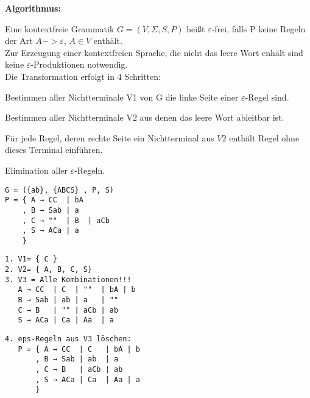 \documentclass[11pt,
			a4paper,
			parskip=full,
			toc=bib,
			toc=idx,
			toc=listof,
			ngerman
			listof=totoc,]{scrartcl}
\newcommand{\ergaenzen}[1]{%
	\tt{%
		\textbf{%
				\textcolor{red}{#1}%
		}%
	}%
	\rm%
}
\newcommand{\concept}[1]{%
	\sf{%
		\textbf{%
				\textcolor{mymauve}{#1}%
		}%
	}%
	\rm%
}
\newenvironment{algo}[1]%
{	\begin{framed}
	\textbf{Algorithmus:} \concept{#1}}%
{\end{framed}}
\newenvironment{expl}%
{\color{red}}
{\color{black}}
\newcommand{\compress}{\vspace{-1em}}
\begin{document}





\newpage
\begin{algo}{Eliminierung aller $ε$-Regeln}

\compress
Eine kontextfreie Grammatik $G=(V,Σ,S,P)$ heißt $ε$-frei,
falls P keine Regeln der Art $A -> ε$, $A \in V$ enthält. \\
Zur Erzeugung einer kontextfreien Sprache, die nicht das leere Wort
enhält sind keine $ε$-Produktionen notwendig.\\
Die Transformation erfolgt in 4 Schritten:

\compress
\begin{compactenum}
\item Bestimmen aller Nichtterminale V1 von G die linke Seite einer $ε$-Regel sind.
\item Bestimmen aller Nichtterminale V2 aus denen das leere Wort ableitbar ist.
\item Für jede Regel, deren rechte Seite ein Nichtterminal aus $V2$ enthält 
      Regel ohne dieses Terminal einführen.
\item Elimination aller $ε$-Regeln.
\end{compactenum}
\end{algo}

\compress
\compress
\begin{expl}
\begin{minipage}[t]{1\linewidth}
  \begin{minipage}[t]{0.3\linewidth}
    \begin{verbatim}
G = ({ab}, {ABCS} , P, S)
P = { A → CC  | bA 
    , B → Sab | a  
    , C → ""  | B  | aCb 
    , S → ACa | a 
    }
    \end{verbatim}
  \end{minipage}
  \begin{minipage}[t]{0.325\linewidth}
    \begin{verbatim}
1. V1= { C }
2. V2= { A, B, C, S} 
3. V3 = Alle Kombinationen!!!
   A → CC  | C  | ""  | bA | b
   B → Sab | ab | a   | ""
   C → B   | "" | aCb | ab
   S → ACa | Ca | Aa  | a 
    \end{verbatim}
  \end{minipage}
  \begin{minipage}[t]{0.3\linewidth}
    \begin{verbatim}
4. eps-Regeln aus V3 löschen:
   P = { A → CC  | C   | bA | b     
       , B → Sab | ab  | a      
       , C → B   | aCb | ab 
       , S → ACa | Ca  | Aa | a
       }     
    \end{verbatim}
  \end{minipage}
\end{minipage}
\end{expl}
\end{document}
